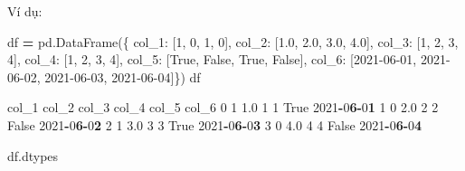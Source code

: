 \documentclass[
]{book}
\newenvironment{Shaded}{\begin{snugshade}}{\end{snugshade}}
\newcommand{\DecValTok}[1]{\textcolor[rgb]{0.00,0.00,0.81}{#1}}
\newcommand{\ErrorTok}[1]{\textcolor[rgb]{0.64,0.00,0.00}{\textbf{#1}}}
\newcommand{\FloatTok}[1]{\textcolor[rgb]{0.00,0.00,0.81}{#1}}
\newcommand{\NormalTok}[1]{#1}
\newcommand{\OperatorTok}[1]{\textcolor[rgb]{0.81,0.36,0.00}{\textbf{#1}}}
\newcommand{\StringTok}[1]{\textcolor[rgb]{0.31,0.60,0.02}{#1}}
\newcommand{\VariableTok}[1]{\textcolor[rgb]{0.00,0.00,0.00}{#1}}
\begin{document}
Ví dụ:

\begin{Shaded}
\begin{Highlighting}[]
\NormalTok{df }\OperatorTok{=}\NormalTok{ pd.DataFrame(\{}
                   \StringTok{\textquotesingle{}col\_1\textquotesingle{}}\NormalTok{: [}\DecValTok{1}\NormalTok{, }\DecValTok{0}\NormalTok{, }\DecValTok{1}\NormalTok{, }\DecValTok{0}\NormalTok{], }
                   \StringTok{\textquotesingle{}col\_2\textquotesingle{}}\NormalTok{: [}\FloatTok{1.0}\NormalTok{, }\FloatTok{2.0}\NormalTok{, }\FloatTok{3.0}\NormalTok{, }\FloatTok{4.0}\NormalTok{], }
                   \StringTok{\textquotesingle{}col\_3\textquotesingle{}}\NormalTok{: [}\StringTok{\textquotesingle{}1\textquotesingle{}}\NormalTok{, }\StringTok{\textquotesingle{}2\textquotesingle{}}\NormalTok{, }\StringTok{\textquotesingle{}3\textquotesingle{}}\NormalTok{, }\StringTok{\textquotesingle{}4\textquotesingle{}}\NormalTok{],}
                   \StringTok{\textquotesingle{}col\_4\textquotesingle{}}\NormalTok{: [}\StringTok{\textquotesingle{}1\textquotesingle{}}\NormalTok{, }\DecValTok{2}\NormalTok{, }\StringTok{\textquotesingle{}3\textquotesingle{}}\NormalTok{, }\DecValTok{4}\NormalTok{],}
                   \StringTok{\textquotesingle{}col\_5\textquotesingle{}}\NormalTok{: [}\VariableTok{True}\NormalTok{, }\VariableTok{False}\NormalTok{, }\VariableTok{True}\NormalTok{, }\VariableTok{False}\NormalTok{],}
                   \StringTok{\textquotesingle{}col\_6\textquotesingle{}}\NormalTok{: [}\StringTok{\textquotesingle{}2021{-}06{-}01\textquotesingle{}}\NormalTok{, }\StringTok{\textquotesingle{}2021{-}06{-}02\textquotesingle{}}\NormalTok{, }\StringTok{\textquotesingle{}2021{-}06{-}03\textquotesingle{}}\NormalTok{, }\StringTok{\textquotesingle{}2021{-}06{-}04\textquotesingle{}}\NormalTok{]\})}
\NormalTok{df}
\end{Highlighting}
\end{Shaded}

\begin{Shaded}
\begin{Highlighting}[]
\NormalTok{   col\_1  col\_2 col\_3 col\_4  col\_5       col\_6}
\DecValTok{0}      \DecValTok{1}    \FloatTok{1.0}     \DecValTok{1}     \DecValTok{1}   \VariableTok{True}  \DecValTok{2021}\OperatorTok{{-}}\DecValTok{0}\ErrorTok{6}\OperatorTok{{-}}\DecValTok{0}\ErrorTok{1}
\DecValTok{1}      \DecValTok{0}    \FloatTok{2.0}     \DecValTok{2}     \DecValTok{2}  \VariableTok{False}  \DecValTok{2021}\OperatorTok{{-}}\DecValTok{0}\ErrorTok{6}\OperatorTok{{-}}\DecValTok{0}\ErrorTok{2}
\DecValTok{2}      \DecValTok{1}    \FloatTok{3.0}     \DecValTok{3}     \DecValTok{3}   \VariableTok{True}  \DecValTok{2021}\OperatorTok{{-}}\DecValTok{0}\ErrorTok{6}\OperatorTok{{-}}\DecValTok{0}\ErrorTok{3}
\DecValTok{3}      \DecValTok{0}    \FloatTok{4.0}     \DecValTok{4}     \DecValTok{4}  \VariableTok{False}  \DecValTok{2021}\OperatorTok{{-}}\DecValTok{0}\ErrorTok{6}\OperatorTok{{-}}\DecValTok{0}\ErrorTok{4}

\NormalTok{df.dtypes}
\end{Highlighting}
\end{Shaded}
\end{document}

